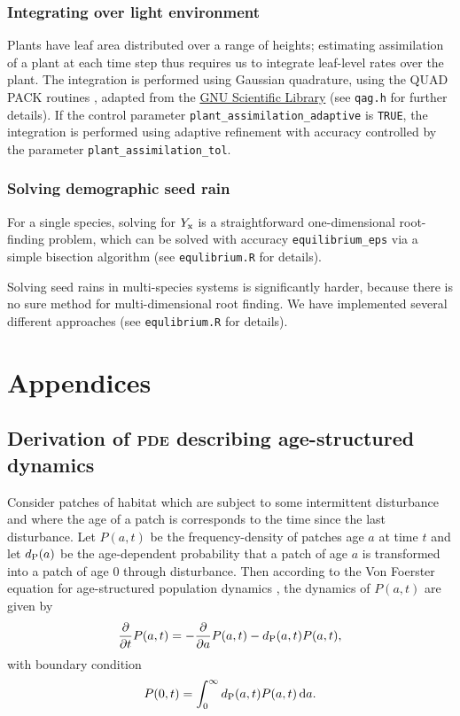 \documentclass[10pt,twoside]{article}
\begin{document}
\subsubsection{Integrating over light
environment}\label{integrating-over-light-environment}

Plants have leaf area distributed over a range of heights; estimating
assimilation of a plant at each time step thus requires us to integrate
leaf-level rates over the plant. The integration is performed using
Gaussian quadrature, using the QUAD PACK routines \citep{Piessens-1983},
adapted from the \href{http://www.gnu.org/software/gsl/}{GNU Scientific
Library}\citep{Galassi-2009} (see \texttt{qag.h} for further details).
If the control parameter \texttt{plant\_assimilation\_adaptive} is \texttt{TRUE},
the integration is performed using adaptive refinement with accuracy
controlled by the parameter \texttt{plant\_assimilation\_tol}.

\subsubsection{Solving demographic seed
rain}\label{solving-demographic-seed-rain}

For a single species, solving for \(Y_{\rm x}\) is a straightforward
one-dimensional root-finding problem, which can be solved with accuracy
\texttt{equilibrium\_eps} via a simple bisection algorithm (see
\texttt{equlibrium.R} for details).

Solving seed rains in multi-species systems is significantly harder,
because there is no sure method for multi-dimensional root finding. We
have implemented several different approaches (see
\texttt{equlibrium.R} for details).

\clearpage

\section{Appendices}\label{appendices}

\subsection{Derivation of \textsc{pde} describing age-structured
dynamics}\label{derivation-of-pde-describing-age-structured-dynamics}

Consider patches of habitat which are subject to some intermittent
disturbance and where the age of a patch is corresponds to the time
since the last disturbance. Let \(P(a, t)\) be the frequency-density of
patches age \(a\) at time \(t\) and let \(d_{\rm P}(a)\) be the
age-dependent probability that a patch of age \(a\) is transformed into
a patch of age \(0\) through disturbance. Then according to the Von
Foerster equation for age-structured population dynamics
\citep{Vonfoerster-1959}, the dynamics of \(P(a, t)\) are given by
\[ \frac{\partial}{\partial t} P(a, t) = -\frac{\partial}{\partial a} P(a, t)-d_{\rm P}(a, t) P(a, t),\]
with boundary condition
\[ P(0, t) = \int^{\infty}_{0}d_{\rm P}(a, t) P(a, t) \, {\rm d}a.\]
\end{document}
